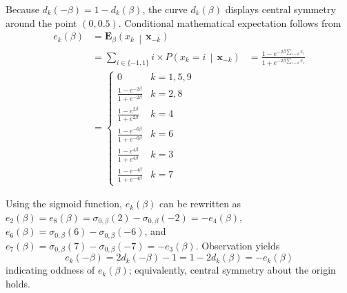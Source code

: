 \documentclass[twoside]{article}
\begin{document}
Because $d_k(-\beta) = 1 - d_k(\beta)$, the curve ${{d}_{k}}\left( \beta \right)$ displays central symmetry around the point $(0,0.5)$. Conditional mathematical expectation follows from
\begin{align*}
e_k\left( \beta \right) &= {{\boldsymbol{E}}_{\beta }}\left( {{x}_{k}} \,\middle|\, {{\boldsymbol{x}}_{-k}} \right)\\
&= \sum\nolimits_{i\in \{-1,1\}} i \times P\left( {{x}_{k}}=i \,\middle|\, {{\boldsymbol{x}}_{-k}} \right) 
&= \frac{1 - e^{-2\beta \sum\nolimits_{i\sim k}{{{x}_{i}}}}}{1 + e^{-2\beta \sum\nolimits_{i\sim k}{{{x}_{i}}}}} \\
&= \begin{cases}
    0 & k = 1, 5, 9 \\
    \frac{1 - e^{-2\beta}}{1 + e^{-2\beta}} & k = 2, 8 \\
    \frac{1 - e^{2\beta}}{1 + e^{2\beta}} & k = 4 \\
    \frac{1 - e^{-6\beta}}{1 + e^{-6\beta}} & k = 6 \\
    \frac{1 - e^{4\beta}}{1 + e^{4\beta}} & k = 3 \\
    \frac{1 - e^{-4\beta}}{1 + e^{-4\beta}} & k = 7
    \end{cases}
\end{align*}

Using the sigmoid function, $e_k\left( \beta \right)$ can be rewritten as $e_2\left( \beta \right)=e_8\left( \beta \right)={\sigma }_{0 ,\beta}(2)-{\sigma }_{0 ,\beta}(-2)=-e_4\left( \beta \right)$, $e_6\left( \beta \right)={\sigma }_{0 ,\beta}(6)-{\sigma }_{0 ,\beta}(-6)$, and $e_7\left( \beta \right)={\sigma }_{0 ,\beta}(7)-{\sigma }_{0 ,\beta}(-7) =-e_3\left( \beta \right)$. Observation yields \[e_k(-\beta) = 2d_k(-\beta) - 1 = 1 - 2d_k(\beta) = -e_k(\beta)\] indicating oddness of ${{e}_{k}}\left( \beta \right)$; equivalently, central symmetry about the origin holds.
\end{document}
